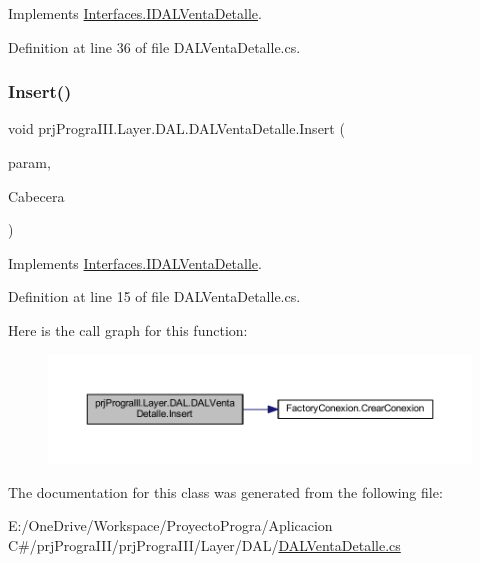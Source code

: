Implements \hyperlink{interface_interfaces_1_1_i_d_a_l_venta_detalle_a47e9941b4a7cc3e41571940ca4d930fa}{Interfaces.\+I\+D\+A\+L\+Venta\+Detalle}.



Definition at line 36 of file D\+A\+L\+Venta\+Detalle.\+cs.

\hypertarget{classprj_progra_i_i_i_1_1_layer_1_1_d_a_l_1_1_d_a_l_venta_detalle_a369ae96a2e9f4a1f15ba28f5a19ab366}{}\label{classprj_progra_i_i_i_1_1_layer_1_1_d_a_l_1_1_d_a_l_venta_detalle_a369ae96a2e9f4a1f15ba28f5a19ab366} 
\subsubsection{\texorpdfstring{Insert()}{Insert()}}
{\footnotesize\ttfamily void prj\+Progra\+I\+I\+I.\+Layer.\+D\+A\+L.\+D\+A\+L\+Venta\+Detalle.\+Insert (\begin{DoxyParamCaption}\item[{\hyperlink{classprj_progra_i_i_i_1_1_layer_1_1_entities_1_1_venta_detalle}{Venta\+Detalle}}]{param,  }\item[{int}]{Cabecera }\end{DoxyParamCaption})}



Implements \hyperlink{interface_interfaces_1_1_i_d_a_l_venta_detalle_a9d92a5b36829f84101bdcb0c5ae5eb3a}{Interfaces.\+I\+D\+A\+L\+Venta\+Detalle}.



Definition at line 15 of file D\+A\+L\+Venta\+Detalle.\+cs.

Here is the call graph for this function\+:
\nopagebreak
\begin{figure}[H]
\begin{center}
\leavevmode
\includegraphics[width=350pt]{classprj_progra_i_i_i_1_1_layer_1_1_d_a_l_1_1_d_a_l_venta_detalle_a369ae96a2e9f4a1f15ba28f5a19ab366_cgraph}
\end{center}
\end{figure}


The documentation for this class was generated from the following file\+:\begin{DoxyCompactItemize}
\item 
E\+:/\+One\+Drive/\+Workspace/\+Proyecto\+Progra/\+Aplicacion C\#/prj\+Progra\+I\+I\+I/prj\+Progra\+I\+I\+I/\+Layer/\+D\+A\+L/\hyperlink{_d_a_l_venta_detalle_8cs}{D\+A\+L\+Venta\+Detalle.\+cs}\end{DoxyCompactItemize}
